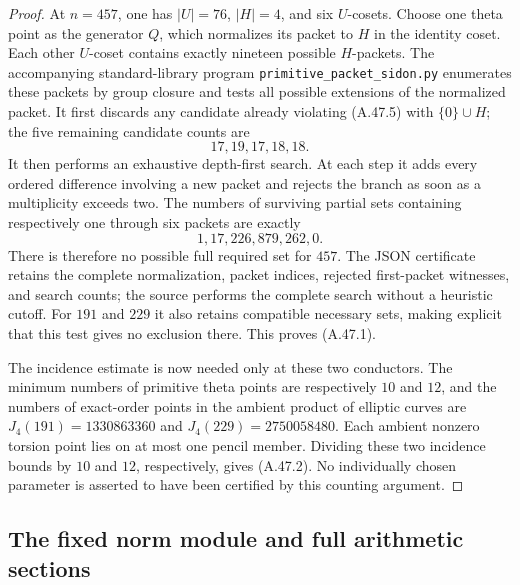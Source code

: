 \documentclass[11pt]{article}
\begin{document}
\begin{proof}
At \(n=457\), one has \(|U|=76\), \(|H|=4\), and six
\(U\)-cosets. Choose one theta point as the generator \(Q\),
which normalizes its packet to \(H\) in the identity coset.
Each other \(U\)-coset contains exactly nineteen possible
\(H\)-packets. The accompanying standard-library program
\texttt{primitive\_packet\_sidon.py} enumerates these packets by
group closure and tests all possible extensions of the normalized
packet. It first discards any candidate already violating
(A.47.5) with \(\{0\}\cup H\); the five remaining candidate
counts are
\[
                            17,19,17,18,18.
\]
It then performs an exhaustive depth-first search. At each step
it adds every ordered difference involving a new packet and
rejects the branch as soon as a multiplicity exceeds two.
The numbers of surviving partial sets containing respectively
one through six packets are exactly
\[
                         1,17,226,879,262,0.
\tag{A.47.6}
\]
There is therefore no possible full required set for \(457\).
The JSON certificate retains the complete normalization, packet
indices, rejected first-packet witnesses, and search counts;
the source performs the complete search without a heuristic cutoff.
For \(191\) and \(229\) it also retains compatible necessary
sets, making explicit that this test gives no exclusion there.
This proves (A.47.1).

The incidence estimate is now needed only at these two conductors.
The minimum numbers of primitive theta points are respectively
\(10\) and \(12\), and the numbers of exact-order points in
the ambient product of elliptic curves are
\(J_4(191)=1330863360\) and \(J_4(229)=2750058480\).
Each ambient nonzero torsion point lies on at most one pencil
member. Dividing these two incidence bounds by \(10\) and
\(12\), respectively, gives (A.47.2). No individually chosen
parameter is asserted to have been certified by this counting
argument.
\end{proof}


\subsection{The fixed norm module and full arithmetic sections}
\end{document}
